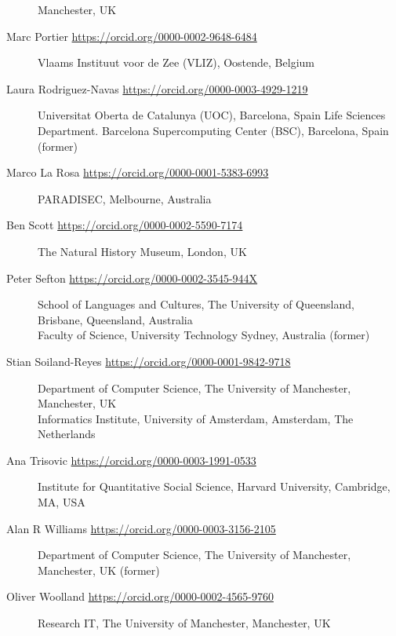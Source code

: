 \begin{description}
Manchester, UK
\item[Marc Portier \url{https://orcid.org/0000-0002-9648-6484}]
Vlaams Instituut voor de Zee (VLIZ), Oostende, Belgium
\item[Laura Rodriguez-Navas \url{https://orcid.org/0000-0003-4929-1219}]
Universitat Oberta de Catalunya (UOC), Barcelona, Spain
Life Sciences Department. Barcelona Supercomputing Center (BSC),
Barcelona, Spain (former)
\item[Marco La Rosa \url{https://orcid.org/0000-0001-5383-6993}]
PARADISEC, Melbourne, Australia
\item[Ben Scott \url{https://orcid.org/0000-0002-5590-7174}]
The Natural History Museum, London, UK
\item[Peter Sefton \url{https://orcid.org/0000-0002-3545-944X}]
School of Languages and Cultures, The
University of Queensland, Brisbane, Queensland, Australia\\
Faculty of Science, University Technology Sydney, Australia (former)
\item[Stian Soiland-Reyes \url{https://orcid.org/0000-0001-9842-9718}]
Department of Computer Science, The University of Manchester,
Manchester, UK\\
Informatics Institute, University of Amsterdam, Amsterdam, The
Netherlands
\item[Ana Trisovic \url{https://orcid.org/0000-0003-1991-0533}]
Institute for Quantitative Social Science, Harvard University,
Cambridge, MA, USA
\item[Alan R Williams \url{https://orcid.org/0000-0003-3156-2105}] 
Department of Computer Science, The University of Manchester,
Manchester, UK (former)
\item[Oliver Woolland \url{https://orcid.org/0000-0002-4565-9760}]
Research IT, The University of Manchester, Manchester, UK
\end{description}


